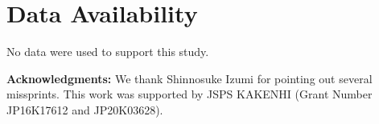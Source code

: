 \documentclass[12pt,draft]{article}
\theoremstyle{plain}
\newtheorem{prop}[theorem]{\bf Proposition}
\numberwithin{equation}{section}
\theoremstyle{remark}
\begin{document}
\begin{comment}
\begin{prop}
Suppose (B1)--(B5).
We further suppose that $g_n=0$ for all sufficiently large $n\in\NN$.
Then the following are equivalent.
\begin{itemize}{}{}
\item[(1)] $\dom(T^{-3/2})\subset\dom(S^{-3/2})$.
\item[(2)] $\dom(S^{-3/2})\supset\dom(T^{-3/2})$.
\item[(3)] $g_n\in\dom(T^{-1})$ for all $n\in\NN$.
\end{itemize} 
\end{prop}

\begin{proof}
The implications (3) $\Rightarrow$ (1) and (3) $\Rightarrow$ (2) follow from Lemma \ref{domain-3/2}.
We next show (1) $\Rightarrow$ (3).
Let $N\in\NN$ be such that $g_n=0$ for all $n\geq N$.
We set
\[
 \sD := \dom(T^2)\cap\dom(T^{-1/2})=\dom(S^2)\cap\dom(S^{-1/2}),
\]
and take an arbitrary $u\in\sD$.
Then we have
\begin{align}
&S^{3/2}u = S^2S^{-1/2}u = \left(T^2+\sum_{n=1}^N\lambda_n\ket{T^{1/2}g_n}\bra{T^{1/2}g_n}\right)S^{-1/2}u\\
&= T^{3/2}\cdot\overline{T^{1/2}S^{-1/2}}u+\sum_{n=1}^N\lambda_n\left\langle \overline{S^{-1/2}T^{1/2}}g_n,u\right\rangle T^{1/2}g_n
\end{align}
\end{proof}
\end{comment}


\section*{Data Availability}
No data were used to support this study.



\vspace*{10pt}
\noindent\textbf{Acknowledgments:}
We thank Shinnosuke Izumi for pointing out several missprints.
This work was supported by JSPS KAKENHI (Grant Number JP16K17612 and JP20K03628).
\end{document}
